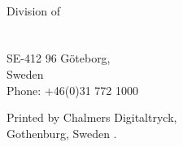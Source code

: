 \vfill

\noindent \identifierNoText

\noindent 
\mydepartment\\
Division of \division\\
\ifx\researchgroup\undefined\else\researchgroup\\\fi
\chalIgu\\
SE-412 96 Göteborg,\\
Sweden\\
Phone: +46(0)31 772 1000

\vskip 1.5cm


\noindent
Printed by Chalmers Digitaltryck,\\
Gothenburg, Sweden \currentyear.
